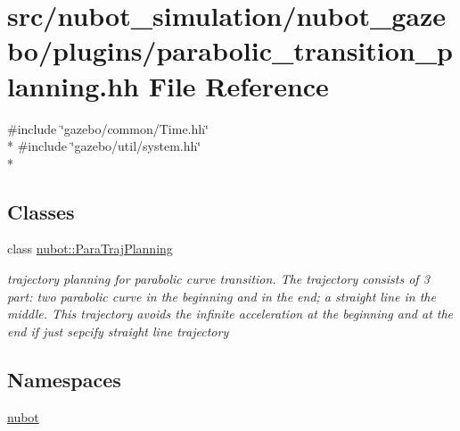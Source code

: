 \hypertarget{parabolic__transition__planning_8hh}{\section{src/nubot\-\_\-simulation/nubot\-\_\-gazebo/plugins/parabolic\-\_\-transition\-\_\-planning.hh File Reference}
\label{parabolic__transition__planning_8hh}
}
{\ttfamily \#include \char`\"{}gazebo/common/\-Time.\-hh\char`\"{}}\\*
{\ttfamily \#include \char`\"{}gazebo/util/system.\-hh\char`\"{}}\\*
\subsection*{Classes}
\begin{DoxyCompactItemize}
\item 
class \hyperlink{classnubot_1_1ParaTrajPlanning}{nubot\-::\-Para\-Traj\-Planning}
\begin{DoxyCompactList}\small\item\em trajectory planning for parabolic curve transition. The trajectory consists of 3 part\-: two parabolic curve in the beginning and in the end; a straight line in the middle. This trajectory avoids the infinite acceleration at the beginning and at the end if just sepcify straight line trajectory \end{DoxyCompactList}\end{DoxyCompactItemize}
\subsection*{Namespaces}
\begin{DoxyCompactItemize}
\item 
\hyperlink{namespacenubot}{nubot}
\end{DoxyCompactItemize}
